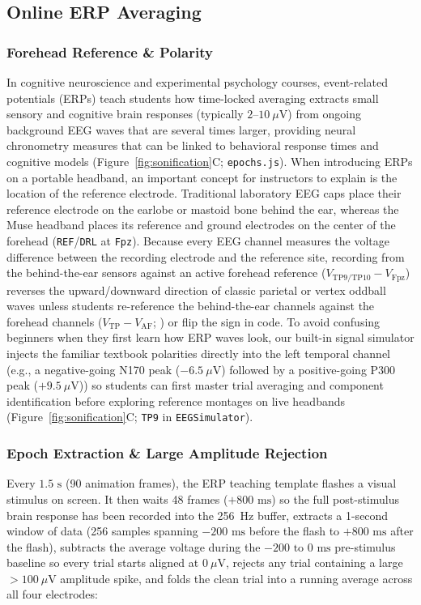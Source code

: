 \documentclass[11pt]{article}
\begin{document}
\subsection{Online ERP Averaging}

\subsubsection{Forehead Reference \& Polarity}
In cognitive neuroscience and experimental psychology courses, event-related potentials (ERPs) teach students how time-locked averaging extracts small sensory and cognitive brain responses (typically $2\text{--}10\ \mu\text{V}$) from ongoing background EEG waves that are several times larger, providing neural chronometry measures that can be linked to behavioral response times and cognitive models \citep{luck2014introduction,krigolson2017choosing,frischkorn2018cognitive,schubert2023enhancing,nunez2024tutorial} (Figure~\ref{fig:sonification}C; \texttt{epochs.js}). When introducing ERPs on a portable headband, an important concept for instructors to explain is the location of the reference electrode. Traditional laboratory EEG caps place their reference electrode on the earlobe or mastoid bone behind the ear, whereas the Muse headband places its reference and ground electrodes on the center of the forehead (\texttt{REF}/\texttt{DRL} at \texttt{Fpz}). Because every EEG channel measures the voltage difference between the recording electrode and the reference site, recording from the behind-the-ear sensors against an active forehead reference ($V_{\text{TP9/TP10}} - V_{\text{Fpz}}$) reverses the upward/downward direction of classic parietal or vertex oddball waves unless students re-reference the behind-the-ear channels against the forehead channels ($V_{\text{TP}} - V_{\text{AF}}$; \citealp{krigolson2017choosing}) or flip the sign in code. To avoid confusing beginners when they first learn how ERP waves look, our built-in signal simulator injects the familiar textbook polarities directly into the left temporal channel (e.g., a negative-going N170 peak ($-6.5\ \mu\text{V}$) followed by a positive-going P300 peak ($+9.5\ \mu\text{V}$)) so students can first master trial averaging and component identification before exploring reference montages on live headbands (Figure~\ref{fig:sonification}C; \texttt{TP9} in \texttt{EEGSimulator}).

\subsubsection{Epoch Extraction \& Large Amplitude Rejection}
Every $1.5\text{ s}$ (90 animation frames), the ERP teaching template flashes a visual stimulus on screen. It then waits 48 frames ($+800\text{ ms}$) so the full post-stimulus brain response has been recorded into the 256~Hz buffer, extracts a 1-second window of data (256 samples spanning $-200\text{ ms}$ before the flash to $+800\text{ ms}$ after the flash), subtracts the average voltage during the $-200\text{ to }0\text{ ms}$ pre-stimulus baseline so every trial starts aligned at $0\ \mu\text{V}$, rejects any trial containing a large $>100\ \mu\text{V}$ amplitude spike, and folds the clean trial into a running average across all four electrodes:
\end{document}
